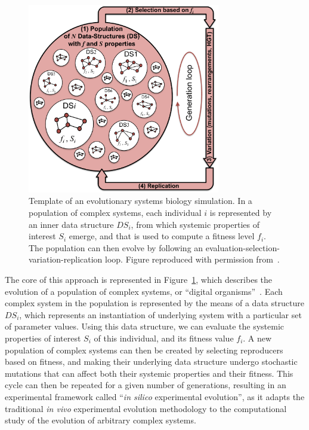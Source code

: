 \begin{figure}
\centering
\includegraphics[width=0.75\textwidth]{background/img/evol_sys_bio.pdf}
\caption[Template of an evolutionary systems biology simulation]{Template of an evolutionary systems biology simulation.
In a population of complex systems, each individual $i$ is represented by an inner data structure $DS_i$, from which systemic properties of interest $S_i$ emerge, and that is used to compute a fitness level $f_i$.
The population can then evolve by following an evaluation-selection-variation-replication loop.
Figure reproduced with permission from~\citep{beslon2021}.}
\label{fig:background:evol-sys-bio}
\end{figure}

The core of this approach is represented in Figure~\ref{fig:background:evol-sys-bio}, which describes the evolution of a population of complex systems, or ``digital organisms''~\citep{adami2006}.
Each complex system in the population is represented by the means of a data structure $DS_i$, which represents an instantiation of  underlying system with a particular set of parameter values.
Using this data structure, we can evaluate the systemic properties of interest $S_i$ of this individual, and its fitness value $f_i$.
A new population of complex systems can then be created by selecting reproducers based on fitness, and making their underlying data structure undergo stochastic mutations that can affect both their systemic properties and their fitness.
This cycle can then be repeated for a given number of generations, resulting in an experimental framework called ``\emph{in silico} experimental evolution'', as it adapts the traditional \emph{in vivo} experimental evolution methodology to the computational study of the evolution of arbitrary complex systems.

